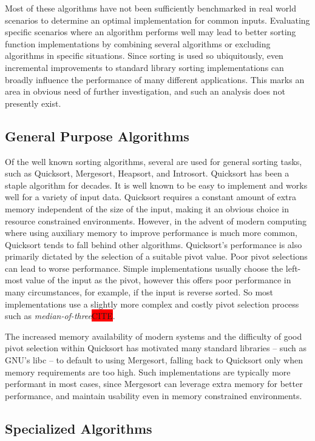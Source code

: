 \documentclass[12pt, conference]{ieeeconf}
\newcommand{\todocite}{\colorbox{red}{CITE}}
\begin{document}
Most of these algorithms have not been sufficiently benchmarked in real world
scenarios to determine an optimal implementation for common inputs. Evaluating
specific scenarios where an algorithm performs well may lead to better sorting
function implementations by combining several algorithms or excluding algorithms
in specific situations. Since sorting is used so ubiquitously, even incremental
improvements to standard library sorting implementations can broadly influence
the performance of many different applications. This marks an area in obvious
need of further investigation, and such an analysis does not presently exist.


\subsection{General Purpose Algorithms}

Of the well known sorting algorithms, several are used for general sorting
tasks, such as Quicksort, Mergesort, Heapsort, and Introsort. Quicksort has been
a staple algorithm for decades. It is well known to be easy to implement and
works well for a variety of input data. Quicksort requires a constant amount of
extra memory independent of the size of the input, making it an obvious choice
in resource constrained environments. However, in the advent of modern computing
where using auxiliary memory to improve performance is much more common,
Quicksort tends to fall behind other algorithms. Quicksort's performance is also
primarily dictated by the selection of a suitable pivot value. Poor pivot
selections can lead to worse performance. Simple implementations usually choose
the left-most value of the input as the pivot, however this offers poor
performance in many circumstances, for example, if the input is reverse sorted.
So most implementations use a slightly more complex and costly pivot selection
process such as \textit{median-of-three}\todocite.

The increased memory availability of modern systems and the difficulty of good
pivot selection within Quicksort has motivated many standard libraries -- such
as GNU's libc -- to default to using Mergesort, falling back to Quicksort only
when memory requirements are too high\parencite{glibc}. Such implementations are
typically more performant in most cases, since Mergesort can leverage extra
memory for better performance, and maintain usability even in memory constrained
environments.

\subsection{Specialized Algorithms}
\end{document}
